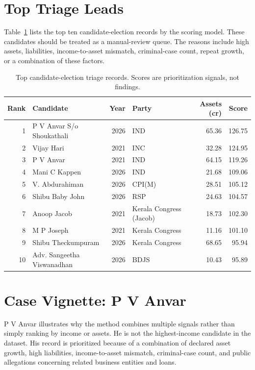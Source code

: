 \documentclass[11pt]{article}
\begin{document}
\section{Top Triage Leads}

Table~\ref{tab:top} lists the top ten candidate-election records by the scoring model. These candidates should be treated as a manual-review queue. The reasons include high assets, liabilities, income-to-asset mismatch, criminal-case count, repeat growth, or a combination of these factors.

\begin{table}[H]
\centering
\small
\begin{tabular}{r l r l r r}
\toprule
Rank & Candidate & Year & Party & Assets (cr) & Score \\
\midrule
1 & P V Anvar S/o Shoukathali & 2026 & IND & 65.36 & 126.75 \\
2 & Vijay Hari & 2021 & INC & 32.28 & 124.95 \\
3 & P V Anvar & 2021 & IND & 64.15 & 119.26 \\
4 & Mani C Kappen & 2026 & IND & 21.68 & 109.06 \\
5 & V. Abdurahiman & 2026 & CPI(M) & 28.51 & 105.12 \\
6 & Shibu Baby John & 2026 & RSP & 24.63 & 104.57 \\
7 & Anoop Jacob & 2021 & Kerala Congress (Jacob) & 18.73 & 102.30 \\
8 & M P Joseph & 2021 & Kerala Congress & 11.16 & 101.10 \\
9 & Shibu Theckumpuram & 2026 & Kerala Congress & 68.65 & 95.94 \\
10 & Adv. Sangeetha Viswanadhan & 2026 & BDJS & 10.43 & 95.89 \\
\bottomrule
\end{tabular}
\caption{Top candidate-election triage records. Scores are prioritization signals, not findings.}
\label{tab:top}
\end{table}

\section{Case Vignette: P V Anvar}

P V Anvar illustrates why the method combines multiple signals rather than simply ranking by income or assets. He is not the highest-income candidate in the dataset. His record is prioritized because of a combination of declared asset growth, high liabilities, income-to-asset mismatch, criminal-case count, and public allegations concerning related business entities and loans.
\end{document}
